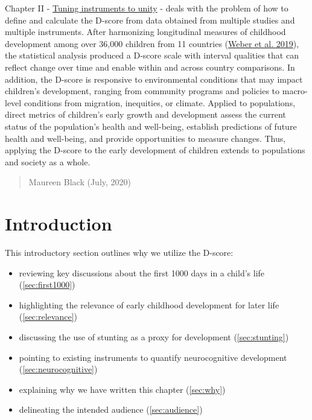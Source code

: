 \documentclass[
]{book}
\providecommand{\tightlist}{%
  \setlength{\itemsep}{0pt}\setlength{\parskip}{0pt}}
\begin{document}
Chapter II - \href{https://d-score.org/dbook2}{Tuning instruments to unity} - deals with the problem of how to define and calculate the D-score from data obtained from multiple studies and multiple instruments. After harmonizing longitudinal measures of childhood development among over 36,000 children from 11 countries (\protect\hyperlink{ref-Weber2019}{Weber et al. 2019}), the statistical analysis produced a D-score scale with interval qualities that can reflect change over time and enable within and across country comparisons. In addition, the D-score is responsive to environmental conditions that may impact children's development, ranging from community programs and policies to macro-level conditions from migration, inequities, or climate. Applied to populations, direct metrics of children's early growth and development assess the current status of the population's health and well-being, establish predictions of future health and well-being, and provide opportunities to measure changes. Thus, applying the D-score to the early development of children extends to populations and society as a whole.

\begin{quote}
Maureen Black (July, 2020)
\end{quote}

\hypertarget{intro}{%
\chapter{Introduction}\label{intro}}

This introductory section outlines why we utilize the D-score:

\begin{itemize}
\tightlist
\item
  reviewing key discussions about the first 1000 days in a child's life (\ref{sec:first1000})
\item
  highlighting the relevance of early childhood development for later life (\ref{sec:relevance})
\item
  discussing the use of stunting as a proxy for development (\ref{sec:stunting})
\item
  pointing to existing instruments to quantify neurocognitive development (\ref{sec:neurocognitive})
\item
  explaining why we have written this chapter (\ref{sec:why})
\item
  delineating the intended audience (\ref{sec:audience})
\end{itemize}
\end{document}
